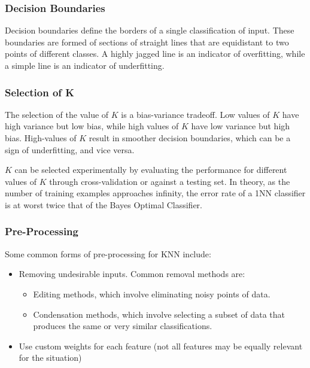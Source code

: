 \documentclass[12pt]{article}
\begin{document}
        \subsubsection{Decision Boundaries}
            Decision boundaries define the borders of a single classification of input. These boundaries are formed of sections of straight lines that are equidistant
            to two points of different classes. A highly jagged line is an indicator of overfitting, while a simple line is an indicator of underfitting.

        \subsubsection{Selection of K}
            The selection of the value of $K$ is a bias-variance tradeoff. Low values of $K$ have high variance but low bias, while high values of $K$ have low variance
            but high bias. High-values of $K$ result in smoother decision boundaries, which can be a sign of underfitting, and vice versa.

            $K$ can be selected experimentally by evaluating the performance for different values of $K$ through cross-validation or against a testing set. In theory, as
            the number of training examples approaches infinity, the error rate of a 1NN classifier is at worst twice that of the Bayes Optimal Classifier.

        \subsubsection{Pre-Processing}
            Some common forms of pre-processing for KNN include:
            \begin{itemize}
              \item Removing undesirable inputs. Common removal methods are:
                \begin{itemize}
                  \item Editing methods, which involve eliminating noisy points of data.
                  \item Condensation methods, which involve selecting a subset of data that produces the same or very similar classifications.
                \end{itemize}
              \item Use custom weights for each feature (not all features may be equally relevant for the situation)
            \end{itemize}
\end{document}
